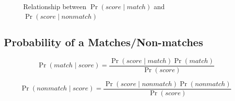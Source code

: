 \begin{figure}[ht]
  \centering
  \label{fig:otago_ent_psm}\\ %
  \label{fig:otago_ent_psnm}\\ %
  \caption{Relationship between $\Pr{(score \mid match)}$ and $\Pr{(score \mid nonmatch)}$}
  \label{fig:emd_grand} %
\end{figure}

\subsection{Probability of a Matches/Non-matches}

$$\Pr{(match \mid score)} = \frac{\Pr{(score \mid match)}\Pr{(match)}}
    {\Pr{(score)}}$$

$$\Pr{(nonmatch \mid score)} = \frac{\Pr{(score \mid nonmatch)}\Pr{(nonmatch)}}
    {\Pr{(score)}}$$

